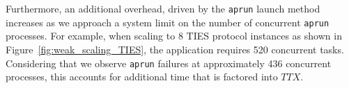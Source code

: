 
Furthermore, an additional overhead, driven by the \texttt{aprun} launch
method increases as we approach a system limit on the number of concurrent
\texttt{aprun} processes. For example, when scaling to 8 TIES protocol
instances as shown in Figure~\ref{fig:weak_scaling_TIES}, the application
requires 520 concurrent tasks. Considering that we observe \texttt{aprun}
failures at approximately 436 concurrent processes, this accounts for
additional time that is factored into \(TTX\).  







